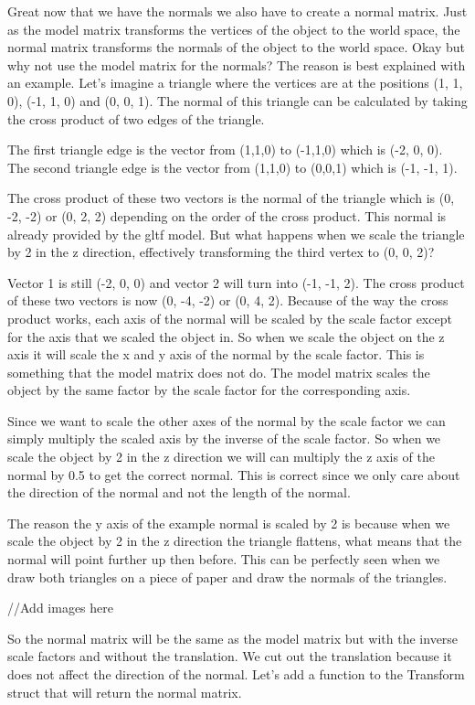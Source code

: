 \documentclass[12pt]{report} \usepackage{preamble}
\begin{document}
Great now that we have the normals we also have to create a normal matrix. Just as the model matrix transforms the vertices of the object to the world space,
the normal matrix transforms the normals of the object to the world space. Okay but why not use the model matrix for the normals? The reason is best explained with an example.
Let's imagine a triangle where the vertices are at the positions (1, 1, 0), (-1, 1, 0) and (0, 0, 1).
The normal of this triangle can be calculated by taking the cross product of two edges of the triangle.

The first triangle edge is the vector from (1,1,0) to (-1,1,0) which is (-2, 0, 0).
The second triangle edge is the vector from (1,1,0) to (0,0,1) which is (-1, -1, 1).

The cross product of these two vectors is the normal of the triangle which is (0, -2, -2) or (0, 2, 2) depending on the order of the cross product.
This normal is already provided by the gltf model. But what happens when we scale the triangle by 2 in the z direction, effectively transforming the third vertex to (0, 0, 2)?

Vector 1 is still (-2, 0, 0) and vector 2 will turn into (-1, -1, 2). The cross product of these two vectors is now (0, -4, -2) or (0, 4, 2).
Because of the way the cross product works, each axis of the normal will be scaled by the scale factor except for the axis that we scaled the object in.
So when we scale the object on the z axis it will scale the x and y axis of the normal by the scale factor. This is something that the model matrix does not do.
The model matrix scales the object by the same factor by the scale factor for the corresponding axis.

Since we want to scale the other axes of the normal by the scale factor we can simply multiply the scaled axis by the inverse of the scale factor.
So when we scale the object by 2 in the z direction we will can multiply the z axis of the normal by 0.5 to get the correct normal.
This is correct since we only care about the direction of the normal and not the length of the normal.

The reason the y axis of the example normal is scaled by 2 is because when we scale the object by 2 in the z direction the triangle flattens, what means that the normal will point further up then before.
This can be perfectly seen when we draw both triangles on a piece of paper and draw the normals of the triangles.

//Add images here

So the normal matrix will be the same as the model matrix but with the inverse scale factors and without the translation.
We cut out the translation because it does not affect the direction of the normal.
Let's add a  function to the Transform struct that will return the normal matrix.
\end{document}
